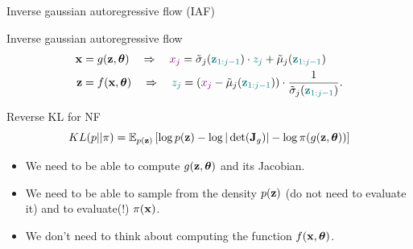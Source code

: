\begin{frame}{Inverse gaussian autoregressive flow (IAF)}
	\begin{block}{Inverse gaussian autoregressive flow}
		\vspace{-0.5cm}
		\begin{align*}
			\mathbf{x} &= g(\mathbf{z}, \boldsymbol{\theta}) \quad \Rightarrow \quad {\color{violet}x_j} = \tilde{\sigma}_j ({\color{teal}\mathbf{z}_{1:j-1}}) \cdot {\color{teal} z_j} + \tilde{\mu}_j({\color{teal}\mathbf{z}_{1:j-1}}) \\
			\mathbf{z} &= f(\mathbf{x}, \boldsymbol{\theta}) \quad \Rightarrow \quad {\color{teal}z_j} = \left( {\color{violet} x_j} - \tilde{\mu}_j({\color{teal}\mathbf{z}_{1:j-1}})\right) \cdot \frac{1}{\tilde{\sigma}_j ({\color{teal}\mathbf{z}_{1:j-1}}) }.
		\end{align*}
		\vspace{-0.3cm}
	\end{block}
	\begin{block}{Reverse KL for NF}
		\vspace{-0.3cm}
		\[
			KL(p || \pi)  = \mathbb{E}_{p(\mathbf{z})} \left[ \log p(\mathbf{z}) -  \log |\det (\mathbf{J}_g)|  - \log \pi(g(\mathbf{z}, \boldsymbol{\theta})) \right]
		\]
		\vspace{-0.3cm}
		\begin{itemize}
			\item We need to be able to compute $g(\mathbf{z}, \boldsymbol{\theta})$ and its Jacobian.
			\item We need to be able to sample from the density $p(\mathbf{z})$ (do not need to evaluate it) and to evaluate(!) $\pi(\mathbf{x})$.
			\item We don’t need to think about computing the function $f(\mathbf{x}, \boldsymbol{\theta})$.
		\end{itemize}
	\end{block}
\end{frame}
